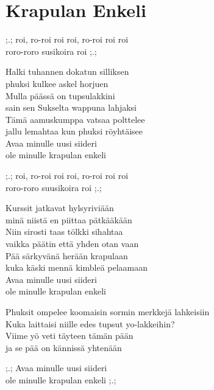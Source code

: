 \section{Krapulan Enkeli}
\vspace*{-0.3cm}
;.; roi, ro-roi roi roi, ro-roi roi roi\\
roro-roro susikoira roi ;.;

Halki tuhannen dokatun silliksen\\
phuksi kulkee askel horjuen\\
Mulla päässä on tupsulakkini\\
sain sen Sukselta wappuna lahjaksi\\
Tämä aamuskumppa vatsaa polttelee\\
jallu lemahtaa kun phuksi röyhtäisee\\
Avaa minulle uusi siideri\\
ole minulle krapulan enkeli

;.; roi, ro-roi roi roi, ro-roi roi roi\\
roro-roro suusikoira roi ;.;

Kurssit jatkavat hylsyriviään\\
minä niistä en piittaa pätkääkään\\
Niin sirosti taas tölkki sihahtaa\\
vaikka päätin että yhden otan vaan\\
Pää särkyvänä herään krapulaan\\
kuka käski mennä kimbleä pelaamaan\\
Avaa minulle uusi siideri\\
ole minulle krapulan enkeli

Phuksit ompelee koomaisin sormin merkkejä lahkeisiin\\
Kuka laittaisi niille edes tupsut yo-lakkeihin?\\
Viime yö veti täyteen tämän pään\\
ja se pää on kännissä yhtenään

;.; Avaa minulle uusi siideri\\
ole minulle krapulan enkeli ;.;